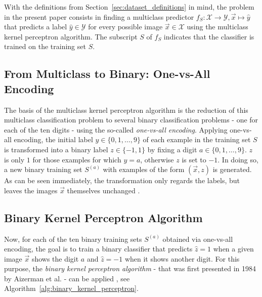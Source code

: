 With the definitions from Section~\ref{sec:dataset_definitions} in mind, the problem in the present paper consists in finding a multiclass predictor $f_S: \mathcal{X} \rightarrow \mathcal{Y}, \vec{x} \mapsto \hat{y}$ that predicts a label $\hat{y} \in \mathcal{Y}$ for every possible image $\vec{x} \in \mathcal{X}$ using the multiclass kernel perceptron algorithm. The subscript $S$ of $f_S$ indicates that the classifier is trained on the training set $S$.


\subsection{From Multiclass to Binary: One-vs-All Encoding}

The basis of the multiclass kernel perceptron algorithm is the reduction of this multiclass classification problem to several binary classification problems - one for each of the ten digits - using the so-called \textit{one-vs-all encoding}. Applying one-vs-all encoding, the initial label $y \in \{0, 1, \dots, 9\}$ of each example in the training set $S$ is transformed into a binary label $z \in \{-1, 1\}$ by fixing a digit $a \in \{0, 1, \dots, 9\}$. $z$ is only $1$ for those examples for which $y=a$, otherwise $z$ is set to $-1$. In doing so, a new binary training set $S^{(a)}$ with examples of the form $(\vec{x}, z)$ is generated. As can be seen immediately, the transformation only regards the labels, but leaves the images $\vec{x}$ themselves unchanged \cite{multiclass2005}.

\subsection{Binary Kernel Perceptron Algorithm}
Now, for each of the ten binary training sets $S^{(a)}$ obtained via one-vs-all encoding, the goal is to train a binary classifier that predicts $\hat{z}=1$ when  a given image $\vec{x}$ shows the digit $a$ and $\hat{z}=-1$ when it shows another digit. For this purpose, the \textit{binary kernel perceptron algorithm} - that was first presented in 1984 by Aizerman et al. - can be applied \cite{kernel1964}, see Algorithm~\ref{alg:binary_kernel_perceptron}. 

